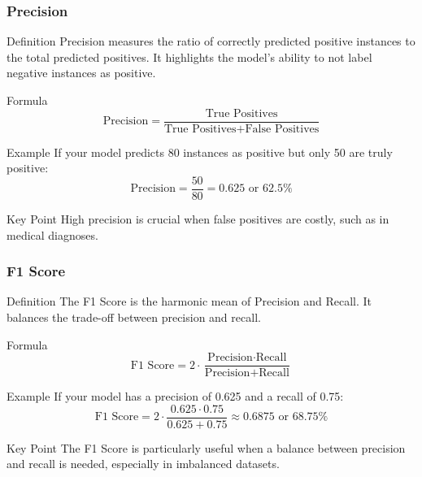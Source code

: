 \documentclass[aspectratio=169]{beamer}
\begin{document}
\begin{frame}[fragile]
    \frametitle{Precision}
    \begin{block}{Definition}
        Precision measures the ratio of correctly predicted positive instances to the total predicted positives. It highlights the model's ability to not label negative instances as positive.
    \end{block}
    \begin{block}{Formula}
        \begin{equation}
        \text{Precision} = \frac{\text{True Positives}}{\text{True Positives} + \text{False Positives}}
        \end{equation}
    \end{block}
    \begin{block}{Example}
        If your model predicts 80 instances as positive but only 50 are truly positive:
        \begin{equation}
        \text{Precision} = \frac{50}{80} = 0.625 \text{ or } 62.5\%
        \end{equation}
    \end{block}
    \begin{block}{Key Point}
        High precision is crucial when false positives are costly, such as in medical diagnoses.
    \end{block}
\end{frame}

\begin{frame}[fragile]
    \frametitle{F1 Score}
    \begin{block}{Definition}
        The F1 Score is the harmonic mean of Precision and Recall. It balances the trade-off between precision and recall.
    \end{block}
    \begin{block}{Formula}
        \begin{equation}
        \text{F1 Score} = 2 \cdot \frac{\text{Precision} \cdot \text{Recall}}{\text{Precision} + \text{Recall}}
        \end{equation}
    \end{block}
    \begin{block}{Example}
        If your model has a precision of 0.625 and a recall of 0.75:
        \begin{equation}
        \text{F1 Score} = 2 \cdot \frac{0.625 \cdot 0.75}{0.625 + 0.75} \approx 0.6875 \text{ or } 68.75\%
        \end{equation}
    \end{block}
    \begin{block}{Key Point}
        The F1 Score is particularly useful when a balance between precision and recall is needed, especially in imbalanced datasets.
    \end{block}
\end{frame}
\end{document}
